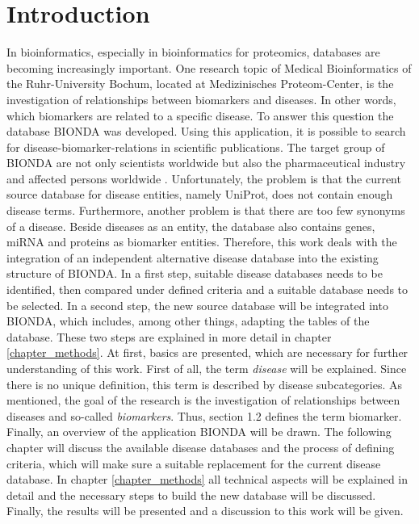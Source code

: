 \chapter{Introduction}
In bioinformatics, especially in bioinformatics for proteomics, databases are becoming increasingly important. One research topic of Medical Bioinformatics of the Ruhr-University Bochum, located at Medizinisches Proteom-Center, is the investigation of relationships between biomarkers and diseases. In other words, which biomarkers are related to a specific disease. To answer this question the database \ac{BIONDA} was developed. Using this application, it is possible to search for disease-biomarker-relations in scientific publications. The target group of \ac{BIONDA} are not only scientists worldwide but also the pharmaceutical industry and affected persons worldwide \citep{Bionda}. Unfortunately, the problem is that the current source database for disease entities, namely \ac{UniProt}, does not contain enough disease terms. Furthermore, another problem is that there are too few synonyms of a disease. Beside diseases as an entity, the database also contains genes, \ac{miRNA} and proteins as biomarker entities. Therefore, this work deals with the integration of an independent alternative disease database into the existing structure of \ac{BIONDA}. In a first step, suitable disease databases needs to be identified, then compared under defined criteria and a suitable database needs to be selected. In a second step, the new source database will be integrated into BIONDA, which includes, among other things, adapting the tables of the database. These two steps are explained in more detail in chapter \ref{chapter_methods}. At first, basics are presented, which are necessary for further understanding of this work. First of all, the term \textit{disease} will be explained. Since there is no unique definition, this term is described by disease subcategories. As mentioned, the goal of the research is the investigation of relationships between diseases and so-called \textit{biomarkers}. Thus, section 1.2 defines the term biomarker. Finally, an overview of the application BIONDA will be drawn. The following chapter will discuss the available disease databases and the process of defining criteria, which will make sure a suitable replacement for the current disease database. In chapter \ref{chapter_methods} all technical aspects will be explained in detail and the necessary steps to build the new database will be discussed. Finally, the results will be presented and a discussion to this work will be given.

